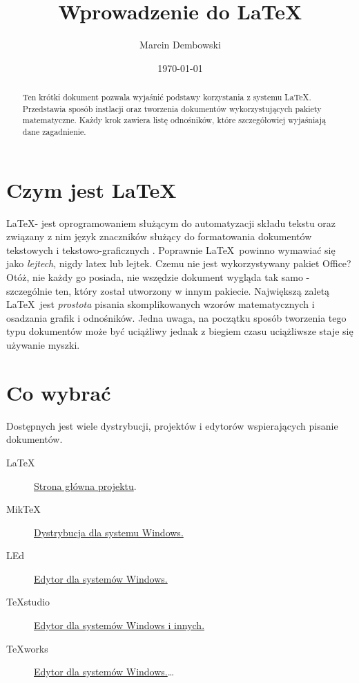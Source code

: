 \documentclass[11pt]{article} %
\title{Wprowadzenie do \LaTeX}
\author{Marcin Dembowski}
\date{\today} %
\theoremstyle{definition}
\theoremstyle{remark}
\begin{document}
\maketitle
\begin{abstract}
Ten krótki dokument pozwala wyjaśnić podstawy korzystania z systemu \LaTeX. Przedstawia sposób instlacji oraz tworzenia dokumentów wykorzystujących pakiety matematyczne. Każdy krok zawiera listę odnośników, które szczegółowiej wyjaśniają dane zagadnienie.
\end{abstract}

\section{Czym jest \LaTeX}
\LaTeX - jest oprogramowaniem służącym do automatyzacji składu tekstu oraz związany z nim język znaczników służący do formatowania dokumentów tekstowych i tekstowo-graficznych \cite{wikipedia_latex}. Poprawnie \LaTeX\ powinno wymawiać się jako \textit{lejtech}, nigdy latex lub lejtek. 
Czemu nie jest wykorzystywany pakiet Office? Otóż, nie każdy go posiada, nie wszędzie dokument wygląda tak samo - szczególnie ten, który został utworzony w innym pakiecie. Największą zaletą \LaTeX\ jest \textit{prostota} pisania skomplikowanych wzorów matematycznych i osadzania grafik i odnośników. Jedna uwaga, na początku sposób tworzenia tego typu dokumentów może być uciążliwy jednak z biegiem czasu uciążliwsze staje się używanie myszki.
\section{Co wybrać}

Dostępnych jest wiele dystrybucji, projektów i edytorów wspierających pisanie dokumentów.

\begin{description}
	\item[LaTeX]
		\href{http://www.latex-project.org/}{Strona główna projektu}.
  \item[MikTeX]
  		\href{http://www.miktex.org/}{Dystrybucja dla systemu Windows.}
  \item[LEd]
  		\href{http://www.latexeditor.org/}{Edytor dla systemów Windows.}
  \item[TeXstudio]
  		\href{http://texstudio.sourceforge.net/}{Edytor dla systemów Windows i innych.}
  \item[TeXworks]
  		\href{http://www.tug.org/texworks/}{Edytor dla systemów Windows.}\ldots
\end{description}
\end{document}
